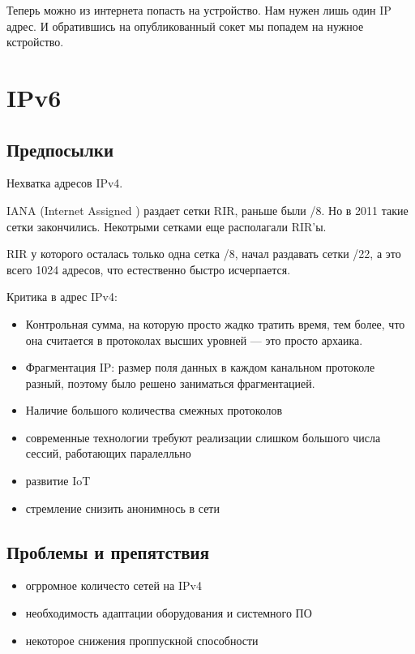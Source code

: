 \documentclass[10pt,a4paper,oneside,titlepage]{report}
\theoremstyle{defenition}
\begin{document}
Теперь можно из интернета попасть на устройство. Нам нужен лишь один IP адрес. И обратившись на опубликованный сокет мы попадем на нужное кстройство. 

\chapter{IPv6}

\section{Предпосылки}

Нехватка адресов IPv4.

IANA (Internet Assigned ) раздает сетки RIR, раньше были /8. Но в 2011 такие сетки закончились. Некотрыми сетками еще располагали RIR'ы. 

RIR у которого осталась только одна сетка /8, начал раздавать сетки /22, а это всего 1024 адресов, что естественно быстро исчерпается.

Критика в адрес IPv4:
\begin{itemize}
	\item Контрольная сумма, на которую просто жадко тратить время, тем более, что она считается в протоколах высших уровней --- это просто архаика.
	\item Фрагментация IP: размер поля данных в каждом канальном протоколе разный, поэтому было решено заниматься фрагментацией.
	\item Наличие большого количества смежных протоколов
\end{itemize} 

\begin{itemize}
	\item современные технологии требуют реализации слишком большого числа сессий, работающих паралелльно
	\item развитие IoT
	\item стремление снизить анонимнось в сети
\end{itemize}

\section{Проблемы и препятствия}

\begin{itemize}
	\item огрромное количесто сетей на IPv4
	\item необходимость адаптации оборудования и системного ПО
	\item некоторое снижения проппускной способности
\end{itemize}
\end{document}
